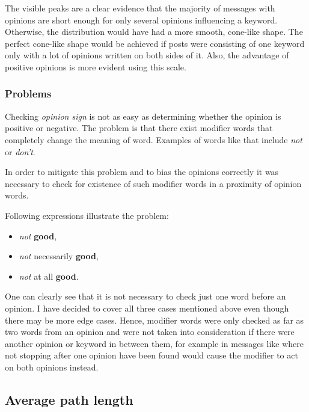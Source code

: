       The visible peaks are a clear evidence that the majority of messages with opinions are short enough for only several opinions influencing a keyword. Otherwise, the distribution would have had a more smooth, cone-like shape. The perfect cone-like shape would be achieved if posts were consisting of one keyword only with a lot of opinions written on both sides of it. Also, the advantage of positive opinions is more evident using this scale.

    \subsubsection{Problems}

      Checking \emph{opinion sign} is not as easy as determining whether the opinion is positive or negative. The problem is that there exist modifier words that completely change the meaning of word. Examples of words like that include \emph{not} or \emph{don't}.
      
      In order to mitigate this problem and to bias the opinions correctly it was necessary to check for existence of such modifier words in a proximity of opinion words.
      
      Following expressions illustrate the problem:
      \begin{itemize}
        \item \emph{not} \textbf{good},
        \item \emph{not} necessarily \textbf{good},
        \item \emph{not} at all \textbf{good}.
      \end{itemize}
      One can clearly see that it is not necessary to check just one word before an opinion. I have decided to cover all three cases mentioned above even though there may be more edge cases. Hence, modifier words were only checked as far as two words from an opinion and were not taken into consideration if there were another opinion or keyword in between them, for example in messages like  where not stopping after one opinion have been found would cause the modifier to act on both opinions instead.

  \subsection{Average path length}

